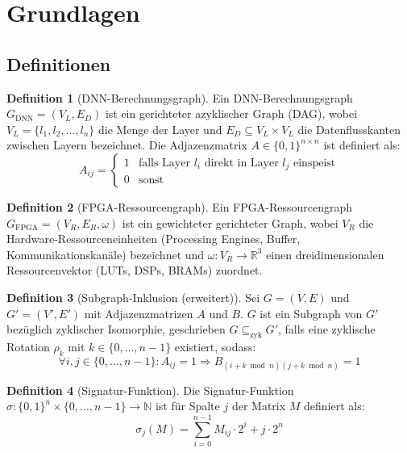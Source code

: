 ﻿\documentclass[a4paper,12pt]{article}
\theoremstyle{definition}
\newtheorem{definition}{Definition}
\begin{document}
\section{Grundlagen}
\label{sec:grundlagen}

\subsection{Definitionen}

\begin{definition}[DNN-Berechnungsgraph]
    Ein DNN-Berechnungsgraph $G_{\text{DNN}} = (V_L, E_D)$ ist ein gerichteter azyklischer
    Graph (DAG), wobei $V_L = \{l_1, l_2, \ldots, l_n\}$ die Menge der Layer und
    $E_D \subseteq V_L \times V_L$ die Datenflusskanten zwischen Layern bezeichnet.
    Die Adjazenzmatrix $A \in \{0,1\}^{n \times n}$ ist definiert als:
    \[
        A_{ij} = \begin{cases} 1 & \text{falls Layer } l_i \text{ direkt in Layer } l_j \text{ einspeist} \\ 0 & \text{sonst} \end{cases}
    \]
\end{definition}

\begin{definition}[FPGA-Ressourcengraph]
    Ein FPGA-Ressourcengraph $G_{\text{FPGA}} = (V_R, E_R, \omega)$ ist ein gewichteter
    gerichteter Graph, wobei $V_R$ die Hardware-Ressourceneinheiten (Processing Engines,
    Buffer, Kommunikationskanäle) bezeichnet und $\omega: V_R \to \mathbb{R}^3$ einen
    dreidimensionalen Ressourcenvektor (LUTs, DSPs, BRAMs) zuordnet.
\end{definition}

\begin{definition}[Subgraph-Inklusion (erweitert)]
    Sei $G = (V, E)$ und $G' = (V', E')$ mit Adjazenzmatrizen $A$ und $B$.
    $G$ ist ein Subgraph von $G'$ bezüglich zyklischer Isomorphie, geschrieben
    $G \subseteq_{\text{zyk}} G'$, falls eine zyklische Rotation $\rho_k$ mit
    $k \in \{0, \ldots, n-1\}$ existiert, sodass:
    \[
        \forall i,j \in \{0,\ldots,n-1\}: A_{ij} = 1 \Rightarrow B_{(i+k \bmod n)(j+k \bmod n)} = 1
    \]
\end{definition}

\begin{definition}[Signatur-Funktion]
    Die Signatur-Funktion $\sigma: \{0,1\}^n \times \{0,\ldots,n-1\} \to \mathbb{N}$
    ist für Spalte $j$ der Matrix $M$ definiert als:
    \[
        \sigma_j(M) = \sum_{i=0}^{n-1} M_{ij} \cdot 2^i + j \cdot 2^n
    \]
\end{definition}
\end{document}
